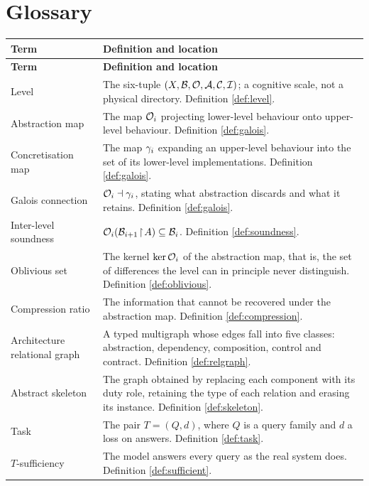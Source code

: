 \chapter{Glossary}\label{app:glossary}

\begin{longtable}{L{3.4cm}L{11.0cm}}
\toprule
\textbf{Term} & \textbf{Definition and location} \\
\midrule
\endfirsthead
\toprule
\textbf{Term} & \textbf{Definition and location} \\
\midrule
\endhead
\bottomrule
\endlastfoot
Level & The six-tuple $(X, \mathcal{B}, \mathcal{O}, \mathcal{A}, \mathcal{C}, \mathcal{I})$; a cognitive scale, not a
  physical directory. Definition \ref{def:level}. \\
Abstraction map & The map $\mathcal{O}_i$ projecting lower-level behaviour onto upper-level
  behaviour. Definition \ref{def:galois}. \\
Concretisation map & The map $\gamma_i$ expanding an upper-level behaviour into the set of
  its lower-level implementations. Definition \ref{def:galois}. \\
Galois connection & $\mathcal{O}_i \dashv \gamma_i$, stating what abstraction discards and what it
  retains. Definition \ref{def:galois}. \\
Inter-level soundness & $\mathcal{O}_i(\mathcal{B}_{i+1}\!\upharpoonright\!A) \subseteq \mathcal{B}_i$.
  Definition \ref{def:soundness}. \\
Oblivious set & The kernel $\operatorname{ker} \mathcal{O}_i$ of the abstraction map, that is, the set of
  differences the level can in principle never distinguish. Definition \ref{def:oblivious}. \\
Compression ratio & The information that cannot be recovered under the abstraction map.
  Definition \ref{def:compression}. \\
Architecture relational graph & A typed multigraph whose edges fall into five classes:
  abstraction, dependency, composition, control and contract. Definition
  \ref{def:relgraph}. \\
Abstract skeleton & The graph obtained by replacing each component with its duty role,
  retaining the type of each relation and erasing its instance. Definition
  \ref{def:skeleton}. \\
Task & The pair $T = (Q, d)$, where $Q$ is a query family and $d$ a loss on answers.
  Definition \ref{def:task}. \\
$T$-sufficiency & The model answers every query as the real system does. Definition
  \ref{def:sufficient}. \\

\end{longtable}

